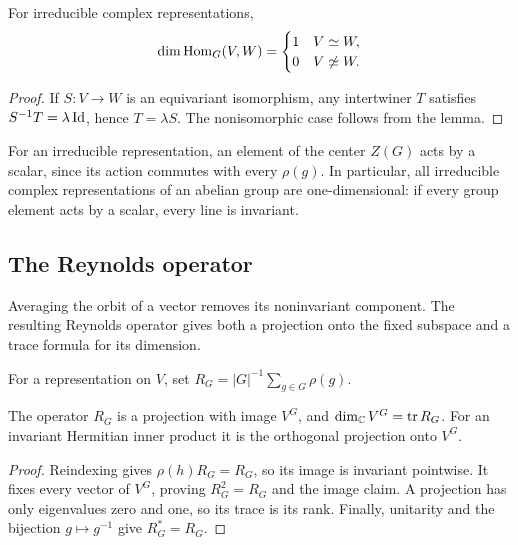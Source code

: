 
\begin{cor}
\label{cor-dim-invariants}\label{notation-84}
For irreducible complex representations,
\[
 \dim\operatorname{Hom}_G(V,W)=\begin{cases}1&V\simeq W,\\0&V\not\simeq W.\end{cases}
\]
\end{cor}
\begin{proof}
If $S:V\to W$ is an equivariant isomorphism, any intertwiner $T$ satisfies
$S^{-1}T=\lambda\operatorname{Id}$, hence $T=\lambda S$. The nonisomorphic case follows
from the lemma.
\end{proof}
\label{notation-85}
For an irreducible representation, an element of the center $Z(G)$ acts
by a scalar, since its action commutes with every $\rho(g)$. In particular,
all irreducible complex representations of an abelian group are
one-dimensional: if every group element acts by a scalar, every line
is invariant.

\subsection{The Reynolds operator}
\label{sect2-operator-reynolds}

Averaging the orbit of a vector removes its noninvariant component. The
resulting Reynolds operator gives both a projection onto the fixed subspace
and a trace formula for its dimension.

\begin{defn}
\label{defn-operator-reynolds}\label{notation-86}
For a representation on $V$, set
$R_G=|G|^{-1}\sum_{g\in G}\rho(g)$.
\end{defn}


\begin{thm}
\label{thm-pte-operator-reynolds}\label{notation-87}
The operator $R_G$ is a projection with image $V^G$, and
$\dim_{\mathbb{C}} V^G=\operatorname{tr}R_G$. For an invariant Hermitian inner
product it is the orthogonal projection onto $V^G$.
\end{thm}
\begin{proof}
Reindexing gives $\rho(h)R_G=R_G$, so its image is invariant pointwise.
It fixes every vector of $V^G$, proving $R_G^2=R_G$ and the image claim.
A projection has only eigenvalues zero and one, so its trace is its rank.
Finally, unitarity and the bijection $g\mapsto g^{-1}$ give $R_G^*=R_G$.
\end{proof}

